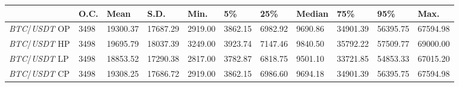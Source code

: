 \begin{tabular}{lllllllllll}
\toprule
 & \textbf{O.C.} & \textbf{Mean} & \textbf{S.D.} & \textbf{Min.} & \textbf{5\%} & \textbf{25\%} & \textbf{Median} & \textbf{75\%} & \textbf{95\%} & \textbf{Max.} \\
\midrule
\emph{BTC}/\emph{USDT} OP & 3498 & 19300.37 & 17687.29 & 2919.00 & 3862.15 & 6982.92 & 9690.86 & 34901.39 & 56395.75 & 67594.98 \\
\emph{BTC}/\emph{USDT} HP & 3498 & 19695.79 & 18037.39 & 3249.00 & 3923.74 & 7147.46 & 9840.50 & 35792.22 & 57509.77 & 69000.00 \\
\emph{BTC}/\emph{USDT} LP & 3498 & 18853.52 & 17290.38 & 2817.00 & 3782.87 & 6818.75 & 9501.10 & 33721.85 & 54853.33 & 67015.20 \\
\emph{BTC}/\emph{USDT} CP & 3498 & 19308.25 & 17686.72 & 2919.00 & 3862.15 & 6986.60 & 9694.18 & 34901.39 & 56395.75 & 67594.98 \\
\bottomrule
\end{tabular}
